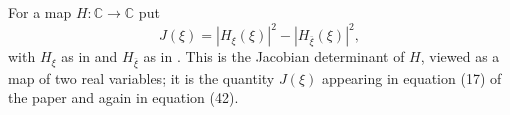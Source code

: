 \begin{definition}
For a map $H\colon\mathbb{C}\to\mathbb{C}$ put
\[
  J(\xi)=|H_\xi(\xi)|^2-|H_{\bar\xi}(\xi)|^2,
\]
with $H_\xi$ as in  and $H_{\bar\xi}$ as in .  This
is the Jacobian determinant of $H$, viewed as a map of two real variables; it
is the quantity $J(\xi)$ appearing in equation (17) of the paper and again in
equation (42).
\end{definition}
